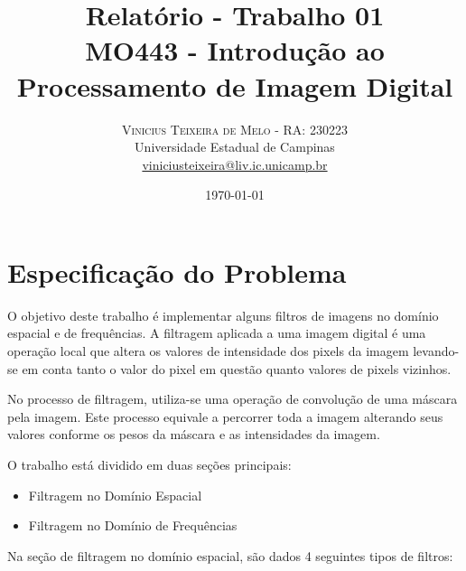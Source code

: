 \documentclass[twoside,twocolumn]{article}
\title{Relatório - Trabalho 01 \\ \Large MO443 - Introdução ao Processamento de Imagem Digital} %
\author{%
\textsc{Vinicius Teixeira de Melo - RA: 230223} \\[1ex] %
\normalsize Universidade Estadual de Campinas \\ %
\normalsize \href{mailto:viniciusteixeira@liv.ic.unicamp.br}{viniciusteixeira@liv.ic.unicamp.br} %
}
\date{\today} %
\begin{document}
\maketitle


\section{Especificação do Problema}

O objetivo deste trabalho é implementar alguns filtros de imagens no domínio espacial e de frequências. A filtragem aplicada a uma imagem digital é uma operação local que altera os valores de intensidade dos pixels da imagem levando-se em conta tanto o valor do pixel em questão quanto valores de pixels vizinhos.

No processo de filtragem, utiliza-se uma operação de convolução de uma máscara pela imagem. Este processo equivale a percorrer toda a imagem alterando seus valores conforme os pesos da máscara e as intensidades da imagem.

O trabalho está dividido em duas seções principais:

\begin{itemize}
	\item Filtragem no Domínio Espacial
	\item Filtragem no Domínio de Frequências
\end{itemize}

Na seção de filtragem no domínio espacial, são dados 4 seguintes tipos de filtros:
\end{document}
